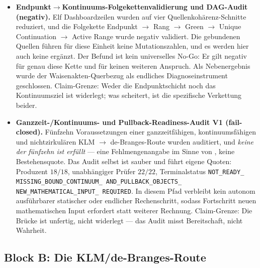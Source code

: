\documentclass[12pt,a4paper]{article}
\theoremstyle{definition}
\theoremstyle{remark}
\begin{document}
\begin{itemize}
  \item \textbf{Endpunkt$\to$Kontinuums-Folgekettenvalidierung und
    DAG-Audit (negativ).} Elf Dashboardzeilen wurden auf vier
    Quellenkohärenz-Schnitte reduziert, und die Folgekette Endpunkt $\to$
    Rang $\to$ Green $\to$ Unique Continuation $\to$ Active Range wurde
    negativ validiert. Die gebundenen Quellen führen für diese Einheit
    keine Mutationszahlen, und es werden hier auch keine ergänzt. Der
    Befund ist kein universelles No-Go: Er gilt negativ für genau diese
    Kette und für keinen weiteren Anspruch. Als Nebenergebnis wurde der
    Waisenakten-Querbezug als endliches Diagnoseinstrument geschlossen.
    Claim-Grenze: Weder die Endpunktschicht noch das Kontinuumsziel ist
    widerlegt; was scheitert, ist die spezifische Verkettung beider.

  \item \textbf{Ganzzeit-/Kontinuums- und Pullback-Readiness-Audit V1
    (fail-closed).} Fünfzehn Voraussetzungen einer ganzzeitfähigen,
    kontinuumsfähigen und nichtzirkulären
    KLM $\to$ de-Branges-Route wurden auditiert, und \emph{keine der
    fünfzehn ist erfüllt} --- eine Fehlmengenangabe im Sinne von
    , keine Bestehensquote. Das Audit selbst ist
    sauber und führt eigene Quoten: Produzent $18/18$, unabhängiger Prüfer
    $22/22$, Terminalstatus \texttt{NOT\_\allowbreak READY\_\allowbreak
    MISSING\_\allowbreak BOUND\_\allowbreak CONTINUUM\_\allowbreak
    AND\_\allowbreak PULLBACK\_\allowbreak OBJECTS\_\allowbreak
    NEW\_\allowbreak MATHEMATICAL\_\allowbreak INPUT\_\allowbreak
    REQUIRED}. In diesem Pfad verbleibt kein autonom ausführbarer
    statischer oder endlicher Rechenschritt, sodass Fortschritt neuen
    mathematischen Input erfordert statt weiterer Rechnung. Claim-Grenze:
    Die Brücke ist unfertig, nicht widerlegt --- das Audit misst
    Bereitschaft, nicht Wahrheit.
\end{itemize}

\subsection{Block B: Die KLM/de-Branges-Route}
\label{sec:v32-block-b}
\end{document}

